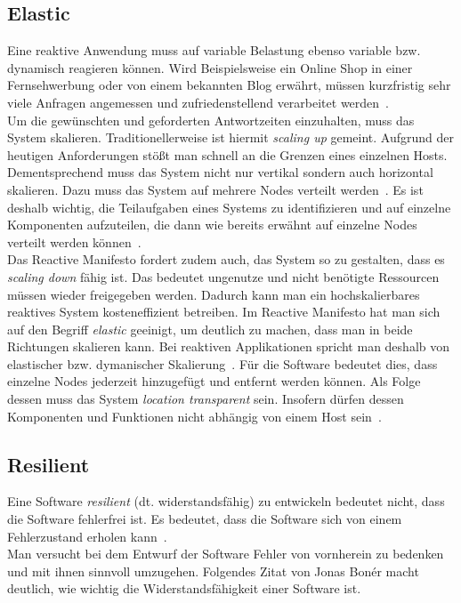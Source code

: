 \subsection{Elastic}\label{subsec:elastic}
Eine reaktive Anwendung muss auf variable Belastung ebenso variable bzw. dynamisch reagieren können. Wird Beispielsweise ein Online Shop in einer Fernsehwerbung oder von einem bekannten Blog erwährt, müssen kurzfristig sehr viele Anfragen angemessen und zufriedenstellend verarbeitet werden~\cite[S.~39]{kuhn_reactive_2015}.\\
Um die gewünschten und geforderten Antwortzeiten einzuhalten, muss das System skalieren. Traditionellerweise ist hiermit \textit{scaling up} gemeint. Aufgrund der heutigen Anforderungen stößt man schnell an die Grenzen eines einzelnen Hosts. Dementsprechend muss das System nicht nur vertikal sondern auch horizontal skalieren. Dazu muss das System auf mehrere Nodes verteilt werden~\cite[S.~7]{vernon_reactive_2016}. Es ist deshalb wichtig, die Teilaufgaben eines Systems zu identifizieren und auf einzelne Komponenten aufzuteilen, die dann wie bereits erwähnt auf einzelne Nodes verteilt werden können~\cite[S.~40]{kuhn_reactive_2015}.\\
Das Reactive Manifesto fordert zudem auch, das System so zu gestalten, dass es \textit{scaling down} fähig ist. Das bedeutet ungenutze und nicht benötigte Ressourcen müssen wieder freigegeben werden. Dadurch kann man ein hochskalierbares reaktives System kosteneffizient betreiben. Im Reactive Manifesto hat man sich auf den Begriff \textit{elastic} geeinigt, um deutlich zu machen, dass man in beide Richtungen skalieren kann. Bei reaktiven Applikationen spricht man deshalb von elastischer bzw. dymanischer Skalierung~\cite[S.~8]{vernon_reactive_2016}. Für die Software bedeutet dies, dass einzelne Nodes jederzeit hinzugefügt und entfernt werden können. Als Folge dessen muss das System \textit{location transparent} sein. Insofern dürfen dessen Komponenten und Funktionen nicht abhängig von einem Host sein~\cite[S.~8]{vernon_reactive_2016}. 


\pagebreak

\subsection{Resilient}\label{subsec:resilient}
Eine Software \textit{resilient} (dt. widerstandsfähig) zu entwickeln bedeutet nicht, dass die Software fehlerfrei ist. Es bedeutet, dass die Software sich von einem Fehlerzustand erholen kann~\cite[S.~6]{vernon_reactive_2016}.\\
Man versucht bei dem Entwurf der Software Fehler von vornherein zu bedenken und mit ihnen sinnvoll umzugehen. Folgendes Zitat von Jonas Bonér macht deutlich, wie wichtig die Widerstandsfähigkeit einer Software ist.

